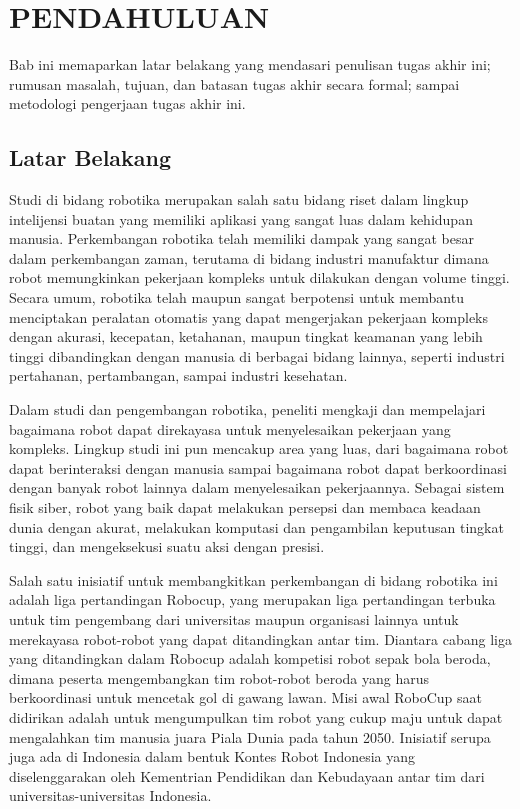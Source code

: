 \chapter{PENDAHULUAN}
\setcounter{page}{1}

Bab ini memaparkan latar belakang yang mendasari penulisan tugas akhir ini; rumusan masalah, tujuan, dan batasan tugas akhir secara formal; sampai metodologi pengerjaan tugas akhir ini.

\section{Latar Belakang}

Studi di bidang robotika merupakan salah satu bidang riset dalam lingkup intelijensi buatan yang memiliki aplikasi yang sangat luas dalam kehidupan manusia. Perkembangan robotika telah memiliki dampak yang sangat besar dalam perkembangan zaman, terutama di bidang industri manufaktur dimana robot memungkinkan pekerjaan kompleks untuk dilakukan dengan volume tinggi. Secara umum, robotika telah maupun sangat berpotensi untuk membantu menciptakan peralatan otomatis yang dapat mengerjakan pekerjaan kompleks dengan akurasi, kecepatan, ketahanan, maupun tingkat keamanan yang lebih tinggi dibandingkan dengan manusia di berbagai bidang lainnya, seperti industri pertahanan, pertambangan, sampai industri kesehatan.

Dalam studi dan pengembangan robotika, peneliti mengkaji dan mempelajari bagaimana robot dapat direkayasa untuk menyelesaikan pekerjaan yang kompleks. Lingkup studi ini pun mencakup area yang luas, dari bagaimana robot dapat berinteraksi dengan manusia sampai bagaimana robot dapat berkoordinasi dengan banyak robot lainnya dalam menyelesaikan pekerjaannya. Sebagai sistem fisik siber, robot yang baik dapat melakukan persepsi dan membaca keadaan dunia dengan akurat, melakukan komputasi dan pengambilan keputusan tingkat tinggi, dan mengeksekusi suatu aksi dengan presisi.

Salah satu inisiatif untuk membangkitkan perkembangan di bidang robotika ini adalah liga pertandingan Robocup, yang merupakan liga pertandingan terbuka untuk tim pengembang dari universitas maupun organisasi lainnya untuk merekayasa robot-robot yang dapat ditandingkan antar tim. Diantara cabang liga yang ditandingkan dalam Robocup adalah kompetisi robot sepak bola beroda, dimana peserta mengembangkan tim robot-robot beroda yang harus berkoordinasi untuk mencetak gol di gawang lawan. Misi awal RoboCup saat didirikan adalah untuk mengumpulkan tim robot yang cukup maju untuk dapat mengalahkan tim manusia juara Piala Dunia pada tahun 2050. Inisiatif serupa juga ada di Indonesia dalam bentuk Kontes Robot Indonesia yang diselenggarakan oleh Kementrian Pendidikan dan Kebudayaan antar tim dari universitas-universitas Indonesia.


